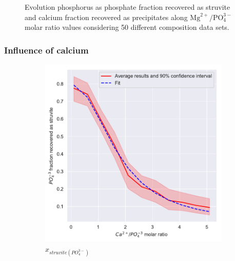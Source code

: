 \begin{refsection}[referencesCh3]
\begin{figure}[h]
	\caption{Evolution phosphorus as phosphate fraction recovered as struvite and calcium fraction recovered as precipitates along $\text{Mg}^{2+}/\text{PO}_{4}^{3-}$ molar ratio values considering 50 different composition data sets.}
	\label{fig:estimation_Mg_ca}
\end{figure}

\subsubsection{Influence of calcium}
\begin{figure}[h] 
	\centering
	\begin{subfigure}[t]{0.32\textheight}
		\includegraphics[width=\textwidth]{gfx/AppendixB/plotStrYield_Ca}
		\caption{$x_{struvite \left(PO_{4}^{3-}\right)}$}
		\label{fig:estimation_Ca_value}
	\end{subfigure}
	\begin{subfigure}[t]{0.32\textheight}

\end{subfigure}
\end{figure}
\end{refsection}
